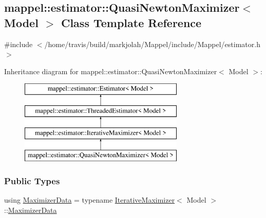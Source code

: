 \hypertarget{classmappel_1_1estimator_1_1QuasiNewtonMaximizer}{}\subsection{mappel\+:\+:estimator\+:\+:Quasi\+Newton\+Maximizer$<$ Model $>$ Class Template Reference}
\label{classmappel_1_1estimator_1_1QuasiNewtonMaximizer}


{\ttfamily \#include $<$/home/travis/build/markjolah/\+Mappel/include/\+Mappel/estimator.\+h$>$}

Inheritance diagram for mappel\+:\+:estimator\+:\+:Quasi\+Newton\+Maximizer$<$ Model $>$\+:\begin{figure}[H]
\begin{center}
\leavevmode
\includegraphics[height=4.000000cm]{classmappel_1_1estimator_1_1QuasiNewtonMaximizer}
\end{center}
\end{figure}
\subsubsection*{Public Types}
\begin{DoxyCompactItemize}
\item 
using \hyperlink{classmappel_1_1estimator_1_1QuasiNewtonMaximizer_a715d110652534690ba16e134d45a782e}{Maximizer\+Data} = typename \hyperlink{classmappel_1_1estimator_1_1IterativeMaximizer}{Iterative\+Maximizer}$<$ Model $>$\+::\hyperlink{classmappel_1_1estimator_1_1QuasiNewtonMaximizer_a715d110652534690ba16e134d45a782e}{Maximizer\+Data}
\end{DoxyCompactItemize}
